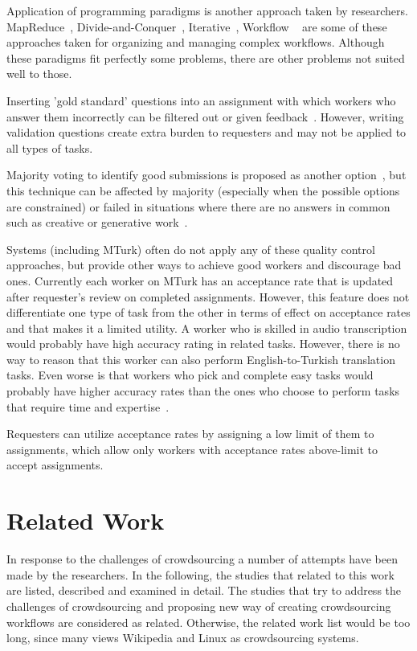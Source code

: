Application of programming paradigms is another approach taken by 
researchers. MapReduce~\cite{Kittur2011, Ahmad2011}, 
Divide-and-Conquer~\cite{Kulkarni2012}, 
Iterative~\cite{Little2009}, 
Workflow ~\cite{Kokciyan2012} are some of these approaches taken for 
organizing and managing complex workflows. Although these paradigms 
fit perfectly some problems, there are other problems not suited well to those.

Inserting 'gold standard' questions into an assignment with which workers 
who answer them incorrectly can be filtered out or given feedback~\cite{Burch2009}. 
However, writing validation questions create extra burden to requesters and 
may not be applied to all types of tasks.

Majority voting to identify good submissions is proposed as another 
option~\cite{Burch2009, Bernstein2010}, but this technique can be affected 
by majority (especially when the possible options are constrained) or failed in 
situations where there are no answers in common such as creative or generative 
work~\cite{Rzeszotarski2012}.

Systems (including MTurk) often do not apply any of these quality control approaches, 
but provide other ways to achieve good workers and discourage bad ones. 
Currently each worker on MTurk has an acceptance rate that is updated after 
requester's review on completed assignments. However, this feature does not 
differentiate one type of task from the other in terms of effect on acceptance rates 
and that makes it a limited utility. A worker who is skilled in audio transcription would 
probably have high accuracy rating in related tasks. However, there is no way to 
reason that this worker can also perform English-to-Turkish translation tasks. 
Even worse is that workers who pick and complete easy tasks would probably 
have higher accuracy rates than the ones who choose to perform tasks that 
require time and expertise~\cite{Barowy2012}.

Requesters can utilize acceptance rates by assigning a low limit of them to 
assignments, which allow only workers with acceptance rates above-limit 
to accept assignments.



\section{Related Work}
In response to the challenges of crowdsourcing a number of attempts have been made 
by the researchers. In the following, the studies that related to this work are listed, 
described and examined in detail. The studies that try to address the challenges of 
crowdsourcing and proposing new way of creating crowdsourcing workflows are
considered as related. Otherwise, the related work list would be too long, 
since many views Wikipedia and Linux as crowdsourcing systems.

